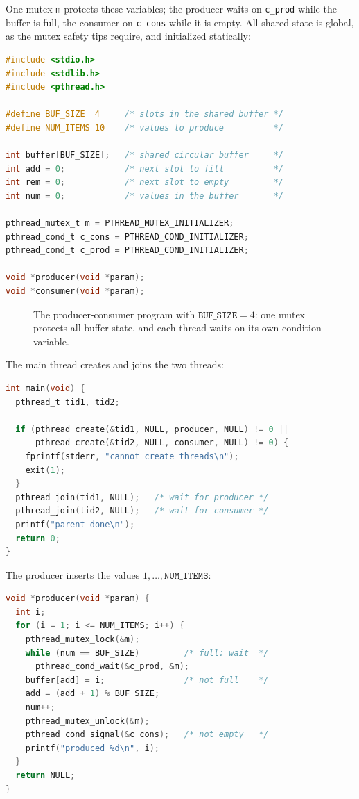 \documentclass[../main.tex]{subfiles}
\begin{document}
One mutex \texttt{m} protects these variables; the producer waits on
\texttt{c\_prod} while the buffer is full, the consumer on \texttt{c\_cons}
while it is empty.  All shared state is global, as the mutex safety tips
require, and initialized statically:
\begin{lstlisting}[language=C, numbers=none]
#include <stdio.h>
#include <stdlib.h>
#include <pthread.h>

#define BUF_SIZE  4     /* slots in the shared buffer */
#define NUM_ITEMS 10    /* values to produce          */

int buffer[BUF_SIZE];   /* shared circular buffer     */
int add = 0;            /* next slot to fill          */
int rem = 0;            /* next slot to empty         */
int num = 0;            /* values in the buffer       */

pthread_mutex_t m = PTHREAD_MUTEX_INITIALIZER;
pthread_cond_t c_cons = PTHREAD_COND_INITIALIZER;
pthread_cond_t c_prod = PTHREAD_COND_INITIALIZER;

void *producer(void *param);
void *consumer(void *param);
\end{lstlisting}

\begin{figure}[htbp]
  \centering
  
  \caption{The producer-consumer program with $\texttt{BUF\_SIZE}=4$:
    one mutex protects all buffer state, and each thread waits on its own
    condition variable.}
  \label{fig:l04-bounded-buffer}
\end{figure}

The main thread creates and joins the two threads:
\begin{lstlisting}[language=C, numbers=none]
int main(void) {
  pthread_t tid1, tid2;

  if (pthread_create(&tid1, NULL, producer, NULL) != 0 ||
      pthread_create(&tid2, NULL, consumer, NULL) != 0) {
    fprintf(stderr, "cannot create threads\n");
    exit(1);
  }
  pthread_join(tid1, NULL);   /* wait for producer */
  pthread_join(tid2, NULL);   /* wait for consumer */
  printf("parent done\n");
  return 0;
}
\end{lstlisting}

The producer inserts the values
$1,\dots,\texttt{NUM\_ITEMS}$:
\begin{lstlisting}[language=C, numbers=none]
void *producer(void *param) {
  int i;
  for (i = 1; i <= NUM_ITEMS; i++) {
    pthread_mutex_lock(&m);
    while (num == BUF_SIZE)         /* full: wait  */
      pthread_cond_wait(&c_prod, &m);
    buffer[add] = i;                /* not full    */
    add = (add + 1) % BUF_SIZE;
    num++;
    pthread_mutex_unlock(&m);
    pthread_cond_signal(&c_cons);   /* not empty   */
    printf("produced %d\n", i);
  }
  return NULL;
}
\end{lstlisting}
\end{document}
